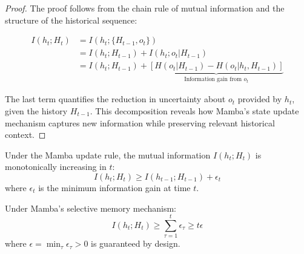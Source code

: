 \begin{proof}
The proof follows from the chain rule of mutual information and the structure of the historical sequence:

\begin{align}
    I(h_t; H_t) &= I(h_t; \{H_{t-1}, o_t\}) \tag{Definition of $H_t$} \\
    &= I(h_t; H_{t-1}) + I(h_t; o_t|H_{t-1}) \tag{Chain rule} \\
    &= I(h_t; H_{t-1}) + \underbrace{[H(o_t|H_{t-1}) - H(o_t|h_t,H_{t-1})]}_{\text{Information gain from } o_t}
\end{align}

The last term quantifies the reduction in uncertainty about $o_t$ provided by $h_t$, given the history $H_{t-1}$. This decomposition reveals how Mamba's state update mechanism captures new information while preserving relevant historical context.
\end{proof}

\begin{corollary}
Under the Mamba update rule, the mutual information $I(h_t; H_t)$ is monotonically increasing in $t$:
\begin{equation}
    I(h_t; H_t) \geq I(h_{t-1}; H_{t-1}) + \epsilon_t
\end{equation}
where $\epsilon_t$ is the minimum information gain at time $t$.
\end{corollary}

\begin{theorem}
Under Mamba's selective memory mechanism:
\begin{equation}
    I(h_t; H_t) \geq \sum_{\tau=1}^t \epsilon_\tau \geq t\epsilon
\end{equation}
where $\epsilon = \min_\tau \epsilon_\tau > 0$ is guaranteed by design.
\end{theorem}

